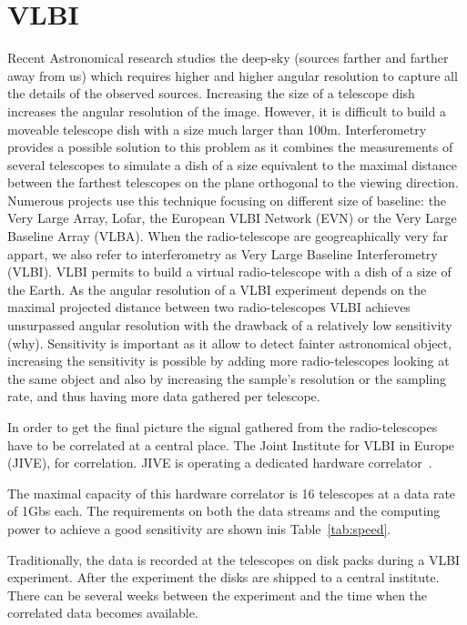 \section{VLBI}\label{sec:vlbi}
Recent Astronomical research studies the deep-sky (sources farther and
farther away from us) which requires higher and higher angular
resolution to capture all the details of the observed sources.
Increasing the size of a telescope dish increases the angular
resolution of the image. However, it is difficult to build a moveable 
telescope dish with a size much larger than 100m. Interferometry 
provides a possible solution to this problem as it combines the measurements of several telescopes to simulate a dish of a size equivalent to the maximal
distance between the farthest telescopes on the plane orthogonal to
the viewing direction. Numerous projects use this technique focusing on different size of baseline:  the Very Large Array, Lofar, the European VLBI Network (EVN) or the Very Large Baseline Array (VLBA). When the radio-telescope are geogreaphically very far appart, we also refer to interferometry as Very Large Baseline Interferometry (VLBI). 
VLBI permits to build a virtual radio-telescope with a dish of a size of 
the Earth. As the angular resolution of a VLBI experiment depends 
on the maximal projected distance between two radio-telescopes VLBI achieves 
unsurpassed angular resolution with the drawback of a relatively 
low sensitivity (why). Sensitivity is important as it 
allow to detect fainter astronomical object, increasing the 
sensitivity is possible by adding more radio-telescopes looking 
at the same object and also by increasing the sample's resolution or 
the sampling rate, and thus having more data gathered per telescope. 

In order to get the final picture the signal gathered from
the radio-telescopes have to be correlated at a central place. 
The Joint Institute for VLBI in Europe (JIVE), for correlation. 
JIVE is operating a dedicated hardware correlator~\cite{EVNCorrelator}.

The maximal capacity of this hardware correlator is 16 telescopes at 
a data rate of 1Gbs each. The requirements on both the data streams and the computing power 
to achieve a good sensitivity are shown inis
Table~\ref{tab:speed}. 

{Traditionally, the data is recorded at the telescopes on
disk packs during a VLBI experiment. After the experiment the disks
are shipped to a central institute. There can be several weeks between 
the experiment and the time when the correlated data becomes available. }


